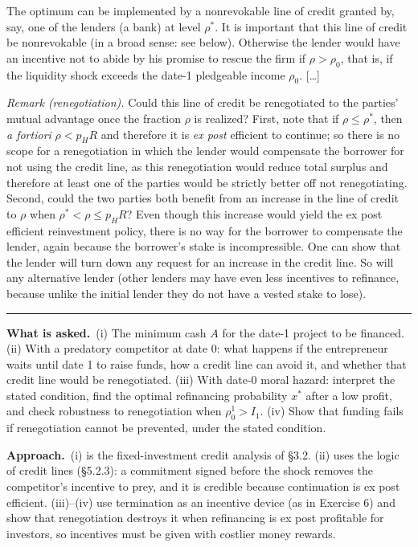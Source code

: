 \documentclass[11pt,a4paper]{article}
\newcommand{\asked}{\par\medskip\noindent\textbf{What is asked.}~}
\newcommand{\approach}{\par\smallskip\noindent\textbf{Approach.}~}
\newcommand{\stmtend}{\par\endgroup\nopagebreak\noindent\rule{\linewidth}{0.4pt}\par\medskip}
\begin{document}
The optimum can be implemented by a nonrevokable line of credit granted by, say, one of the lenders
(a bank) at level \(\rho^*\). It is important that this line of credit be nonrevokable (in a broad
sense: see below). Otherwise the lender would have an incentive not to abide by his promise to
rescue the firm if \(\rho > \rho_0\), that is, if the liquidity shock exceeds the date-1 pledgeable
income \(\rho_0\). {[}\ldots{]}

\emph{Remark (renegotiation).} Could this line of credit be renegotiated to the parties' mutual
advantage once the fraction \(\rho\) is realized? First, note that if \(\rho \leqslant \rho^*\),
then \emph{a fortiori} \(\rho < p_HR\) and therefore it is \emph{ex post} efficient to continue; so
there is no scope for a renegotiation in which the lender would compensate the borrower for not
using the credit line, as this renegotiation would reduce total surplus and therefore at least one
of the parties would be strictly better off not renegotiating. Second, could the two parties both
benefit from an increase in the line of credit to \(\rho\) when \(\rho^* < \rho \leqslant p_HR\)?
Even though this increase would yield the ex post efficient reinvestment policy, there is no way for
the borrower to compensate the lender, again because the borrower's stake is incompressible. One can
show that the lender will turn down any request for an increase in the credit line. So will any
alternative lender (other lenders may have even less incentives to refinance, because unlike the
initial lender they do not have a vested stake to lose).
\stmtend

\asked (i) The minimum cash $A$ for the date-1 project to be financed. (ii) With a predatory competitor at date 0: what happens if the entrepreneur waits until date 1 to raise funds, how a credit line can avoid it, and whether that credit line would be renegotiated. (iii) With date-0 moral hazard: interpret the stated condition, find the optimal refinancing probability $x^*$ after a low profit, and check robustness to renegotiation when $\rho_0^1>I_1$. (iv) Show that funding fails if renegotiation cannot be prevented, under the stated condition.

\approach (i) is the fixed-investment credit analysis of \S 3.2. (ii) uses the logic of credit lines (\S 5.2.3): a commitment signed before the shock removes the competitor's incentive to prey, and it is credible because continuation is ex post efficient. (iii)--(iv) use termination as an incentive device (as in Exercise 6) and show that renegotiation destroys it when refinancing is ex post profitable for investors, so incentives must be given with costlier money rewards.
\end{document}
